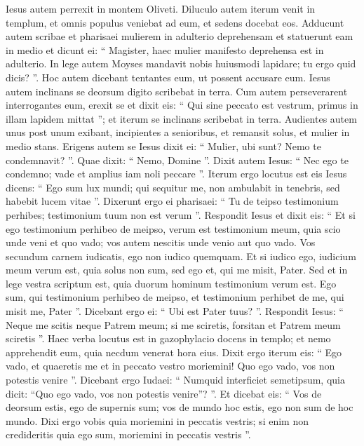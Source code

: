 \begin{biblechapter}
\begin{biblechapter}
\begin{biblechapter}
\begin{biblechapter}
\begin{biblechapter}
\begin{biblechapter}
\begin{biblechapter}
\begin{biblechapter}
\verse Iesus autem perrexit in montem Oliveti. 
\verse Diluculo autem iterum venit in templum, et omnis populus veniebat ad eum, et sedens docebat eos. 
\verse Adducunt autem scribae et pharisaei mulierem in adulterio deprehensam et statuerunt eam in medio 
\verse et dicunt ei: “ Magister, haec mulier manifesto deprehensa est in adulterio. 
\verse In lege autem Moyses mandavit nobis huiusmodi lapidare; tu ergo quid dicis? ”. 
\verse Hoc autem dicebant tentantes eum, ut possent accusare eum. Iesus autem inclinans se deorsum digito scribebat in terra. 
\verse Cum autem perseverarent interrogantes eum, erexit se et dixit eis: “ Qui sine peccato est vestrum, primus in illam lapidem mittat ”; 
\verse et iterum se inclinans scribebat in terra. 
\verse Audientes autem unus post unum exibant, incipientes a senioribus, et remansit solus, et mulier in medio stans. 
\verse Erigens autem se Iesus dixit ei: “ Mulier, ubi sunt? Nemo te condemnavit? ”. 
\verse Quae dixit: “ Nemo, Domine ”. Dixit autem Iesus: “ Nec ego te condemno; vade et amplius iam noli peccare ”.
 \verse Iterum ergo locutus est eis Iesus dicens: “ Ego sum lux mundi; qui sequitur me, non ambulabit in tenebris, sed habebit lucem vitae ”. 
\verse Dixerunt ergo ei pharisaei: “ Tu de teipso testimonium perhibes; testimonium tuum non est verum ”. 
\verse Respondit Iesus et dixit eis: “ Et si ego testimonium perhibeo de meipso, verum est testimonium meum, quia scio unde veni et quo vado; vos autem nescitis unde venio aut quo vado. 
\verse Vos secundum carnem iudicatis, ego non iudico quemquam. 
\verse Et si iudico ego, iudicium meum verum est, quia solus non sum, sed ego et, qui me misit, Pater. 
\verse Sed et in lege vestra scriptum est, quia duorum hominum testimonium verum est. 
\verse Ego sum, qui testimonium perhibeo de meipso, et testimonium perhibet de me, qui misit me, Pater ”. 
\verse Dicebant ergo ei: “ Ubi est Pater tuus? ”. Respondit Iesus: “ Neque me scitis neque Patrem meum; si me sciretis, forsitan et Patrem meum sciretis ”. 
\verse Haec verba locutus est in gazophylacio docens in templo; et nemo apprehendit eum, quia necdum venerat hora eius.
 \verse Dixit ergo iterum eis: “ Ego vado, et quaeretis me et in peccato vestro moriemini! Quo ego vado, vos non potestis venire ”. 
\verse Dicebant ergo Iudaei: “ Numquid interficiet semetipsum, quia dicit: “Quo ego vado, vos non potestis venire”? ”. 
\verse Et dicebat eis: “ Vos de deorsum estis, ego de supernis sum; vos de mundo hoc estis, ego non sum de hoc mundo. 
\verse Dixi ergo vobis quia moriemini in peccatis vestris; si enim non credideritis quia ego sum, moriemini in peccatis vestris ”. 

\end{biblechapter}
\end{biblechapter}
\end{biblechapter}
\end{biblechapter}
\end{biblechapter}
\end{biblechapter}
\end{biblechapter}
\end{biblechapter}

